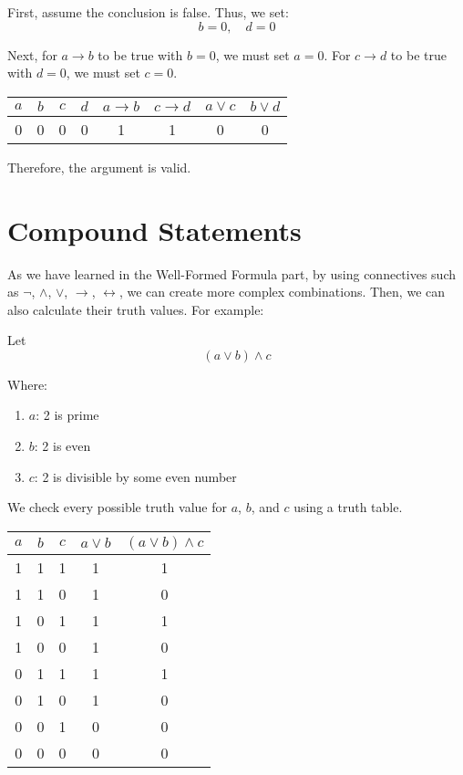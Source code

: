 \documentclass[12pt,a4paper,openany]{article}
\begin{document}
First, assume the conclusion is false. Thus, we set:
$$ b = 0, \quad d = 0 $$

Next, for $a \to b$ to be true with $b = 0$, we must set $a = 0$.
For $c \to d$ to be true with $d = 0$, we must set $c = 0$.

\begin{center}
\begin{tabular}{|c|c|c|c|c|c|c|c|}
\hline
$a$ & $b$ & $c$ & $d$ & $a \to b$ & $c \to d$ & $a \lor c$ & $b \lor d$ \\
\hline
\textcolor{falsecolor}{0} & \textcolor{falsecolor}{0} & \textcolor{falsecolor}{0} & \textcolor{falsecolor}{0} & \textcolor{truecolor}{1} & \textcolor{truecolor}{1} & \textcolor{falsecolor}{0} & \textcolor{falsecolor}{0} \\
\hline
\end{tabular}
\end{center}

Therefore, the argument is valid.


\section{Compound Statements}

As we have learned in the Well-Formed Formula part, by using
connectives such as \(\neg\), \(\land\), \(\lor\), \(\to\),
\(\leftrightarrow\), we can create more complex combinations. Then, we
can also calculate their truth values. For example:


Let
\[
(a \lor b) \land c
\]

Where:

\begin{enumerate}[label={}, left=0pt]
\item $a$: 2 is prime
\item $b$: 2 is even
\item $c$: 2 is divisible by some even number
\end{enumerate}

We check every possible truth value for \(a\), \(b\), and \(c\) using a truth table.

\begin{center}
\begin{tabular}{|c|c|c|c|c|}
\hline
\(a\) & \(b\) & \(c\) & \(a \lor b\) & \((a \lor b) \land c\) \\
\hline
1 & 1 & 1 & 1 & 1 \\
1 & 1 & 0 & 1 & 0 \\
1 & 0 & 1 & 1 & 1 \\
1 & 0 & 0 & 1 & 0 \\
0 & 1 & 1 & 1 & 1 \\
0 & 1 & 0 & 1 & 0 \\
0 & 0 & 1 & 0 & 0 \\
0 & 0 & 0 & 0 & 0 \\
\hline
\end{tabular}
\end{center}
\end{document}

